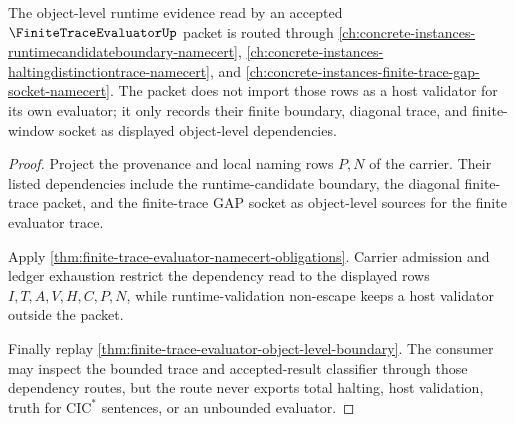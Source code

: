 \begin{theorem}
\label{thm:finite-trace-evaluator-runtime-nonimport}
The object-level runtime evidence read by an accepted
$\FiniteTraceEvaluatorUp$ packet is routed through
\autoref{ch:concrete-instances-runtimecandidateboundary-namecert},
\autoref{ch:concrete-instances-haltingdistinctiontrace-namecert}, and
\autoref{ch:concrete-instances-finite-trace-gap-socket-namecert}. The packet
does not import those rows as a host validator for its own evaluator; it only
records their finite boundary, diagonal trace, and finite-window socket as
displayed object-level dependencies.
\end{theorem}
\begin{proof}
Project the provenance and local naming rows $P,N$ of the carrier. Their
listed dependencies include the runtime-candidate boundary, the diagonal
finite-trace packet, and the finite-trace GAP socket as object-level sources
for the finite evaluator trace.

Apply \autoref{thm:finite-trace-evaluator-namecert-obligations}. Carrier
admission and ledger exhaustion restrict the dependency read to the displayed
rows $I,T,A,V,H,C,P,N$, while runtime-validation non-escape keeps a host
validator outside the packet.

Finally replay \autoref{thm:finite-trace-evaluator-object-level-boundary}. The
consumer may inspect the bounded trace and accepted-result classifier through
those dependency routes, but the route never exports total halting, host
validation, truth for $\mathrm{CIC}^{*}$ sentences, or an unbounded evaluator.
\end{proof}

